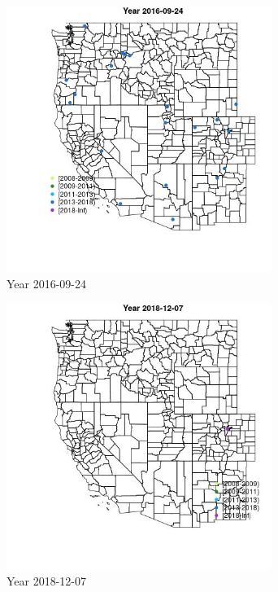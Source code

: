 \begin{figure} 
\centering  
\includegraphics[width=0.77\textwidth]{Code_Outputs/Report_ML_input_PM25_Step4_part_e_de_duplicated_aves_MapObsYear2016-09-24.jpg} 
\caption{\label{fig:Report_ML_input_PM25_Step4_part_e_de_duplicated_avesMapObsYear2016-09-24}Year 2016-09-24} 
\end{figure} 
 

\begin{figure} 
\centering  
\includegraphics[width=0.77\textwidth]{Code_Outputs/Report_ML_input_PM25_Step4_part_e_de_duplicated_aves_MapObsYear2018-12-07.jpg} 
\caption{\label{fig:Report_ML_input_PM25_Step4_part_e_de_duplicated_avesMapObsYear2018-12-07}Year 2018-12-07} 
\end{figure} 
 


